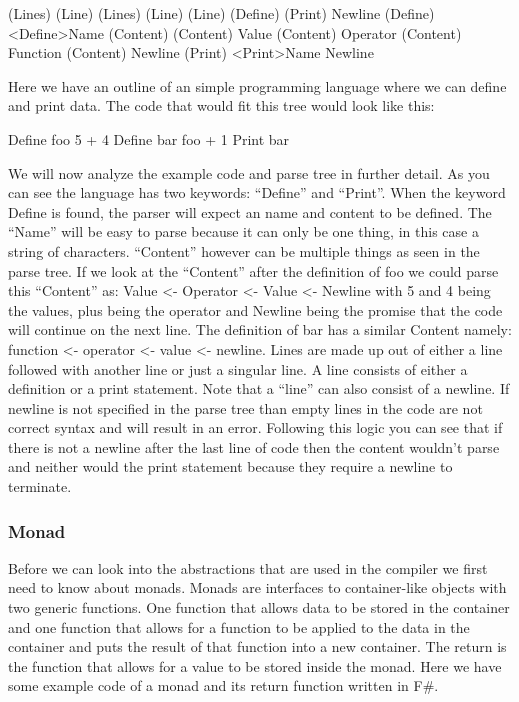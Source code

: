 \begin{code}
	(Lines) 
		(Line) (Lines) 
		(Line) 
	(Line) 
		(Define) 
		(Print) 
		Newline 
	(Define) 
		<Define>Name (Content)
	(Content) 
		Value (Content) 
		Operator (Content) 
		Function (Content) 
		Newline 
	(Print) 
		<Print>Name Newline
\end{code}

Here we have an outline of an simple programming language where we can define and print data. The code that would fit this tree would look like this: 


\begin{code}
	Define foo 5 + 4 
	Define bar foo + 1 
	Print bar 
\end{code}


We will now analyze the example code and parse tree in further detail. 
\linebreak
As you can see the language has two keywords: “Define” and “Print”. When the keyword Define is found, the parser will expect an name and content to be defined. The “Name” will be easy to parse because it can only be one thing, in this case a string of characters. “Content” however can be multiple things as seen in the parse tree. If we look at the “Content” after the definition of foo we could parse this “Content” as: Value <- Operator <- Value <- Newline with 5 and 4 being the values, plus being the operator and Newline being the promise that the code will continue on the next line. The definition of bar has a similar Content namely: function <- operator <- value <- newline. 
\linebreak
Lines are made up out of either a line followed with another line or just a singular line. A line consists of either a definition or a print statement. Note that a “line” can also consist of a newline. If newline is not specified in the parse tree than empty lines in the code are not correct syntax and will result in an error. Following this logic you can see that if there is not a newline after the last line of code then the content wouldn’t parse and neither would the print statement because they require a newline to terminate.

\subsubsection{Monad}

Before we can look into the abstractions that are used in the compiler we first need to know about monads.
\linebreak
Monads are interfaces to container-like objects with two generic functions. One function that allows data to be stored in the container and one function that allows for a function to be applied to the data in the container and puts the result of that function into a new container.
\linebreak
The return is the function that allows for a value to be stored inside the monad. Here we have some example code of a monad and its return function written in F\#.

